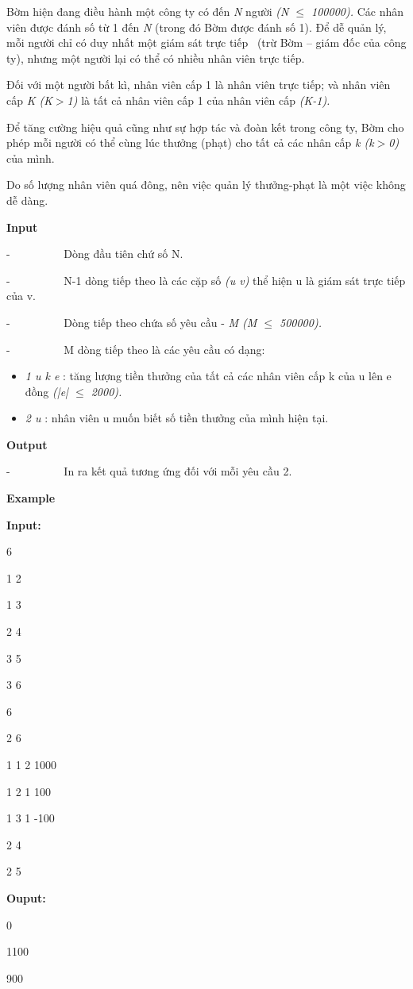 



   Bờm hiện đang điều hành một công ty có đến   \emph{    N   }   người   \emph{    (N  $\le$  100000).   }   Các nhân viên được đánh số từ 1 đến   \emph{    N   }   (trong đó Bờm được đánh số 1). Để dễ quản lý, mỗi người chỉ có duy nhất một giám sát trực tiếp  (trừ Bờm – giám đốc của công ty), nhưng một người lại có thể có nhiều nhân viên trực tiếp.  

   Đối với một người bất kì, nhân viên cấp 1 là nhân viên trực tiếp; và nhân viên cấp   \emph{    K (K$>$1)   }   là tất cả nhân viên cấp 1 của nhân viên cấp   \emph{    (K-1).   }

   Để tăng cường hiệu quả cũng như sự hợp tác và đoàn kết trong công ty, Bờm cho phép mỗi người có thể cùng lúc thưởng (phạt) cho tất cả các nhân cấp   \emph{    k (k$>$0)   }   của mình.  

   Do số lượng nhân viên quá đông, nên việc quản lý thưởng-phạt là một việc không dễ dàng.  

\textbf{    Input   }

   -          Dòng đầu tiên chứ số N.  

   -          N-1 dòng tiếp theo là các cặp số   \emph{    (u v)   }   thể hiện u là giám sát trực tiếp của v.  

   -          Dòng tiếp theo chứa số yêu cầu -   \emph{    M (M $\le$ 500000).   }

   -          M dòng tiếp theo là các yêu cầu có dạng:  
\begin{itemize}
	\item \emph{     1 u k e    }    : tăng lượng tiền thưởng của tất cả các nhân viên cấp k của u lên e đồng    \emph{     (|e|  $\le$  2000).    }
	\item \emph{     2 u    }    : nhân viên u muốn biết số tiền thưởng của mình hiện tại.   
\end{itemize}

\textbf{    Output   }

   -          In ra kết quả tương ứng đối với mỗi yêu cầu 2.  

\textbf{    Example   }

\textbf{    Input:   }

   6  

   1 2  

   1 3  

   2 4  

   3 5  

   3 6  

   6  

   2 6  

   1 1 2 1000  

   1 2 1 100  

   1 3 1 -100  

   2 4  

   2 5  



\textbf{    Ouput:   }

   0  

   1100  

   900  

\textbf{}
